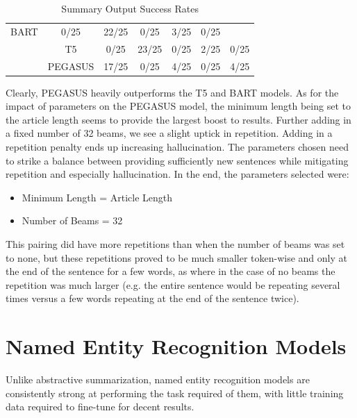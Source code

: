 \documentclass[12pt]{report}
\begin{document}
\begin{table}[H]
\begin{center}
{\begin{tabular}{|c|c|c|c|c|c|c|}
                 BART & 0/25 & 22/25 & 0/25 & 3/25 & 0/25\\&
                 T5 & 0/25 & 23/25 & 0/25 & 2/25 & 0/25\\&
                 PEGASUS & 17/25 & 0/25 & 4/25 & 0/25 & 4/25\\\cline{2-6}
                \hline
            \end{tabular}}
            \end{center}
            \caption{Summary Output Success Rates}
            \label{tab:verify_sum}
            \end{table}
        
        Clearly, PEGASUS heavily outperforms the T5 and BART models. As for the impact of parameters on the PEGASUS model, the minimum length being set to the article length seems to provide the largest boost to results. Further adding in a fixed number of 32 beams, we see a slight uptick in repetition. Adding in a repetition penalty ends up increasing hallucination. The parameters chosen need to strike a balance between providing sufficiently new sentences while mitigating repetition and especially hallucination. In the end, the parameters selected were:
        
        \begin{itemize}
            \item Minimum Length = Article Length
            \item Number of Beams = 32
        \end{itemize}
        
        This pairing did have more repetitions than when the number of beams was set to none, but these repetitions proved to be much smaller token-wise and only at the end of the sentence for a few words, as where in the case of no beams the repetition was much larger (e.g. the entire sentence would be repeating several times versus a few words repeating at the end of the sentence twice).

    \section{Named Entity Recognition Models}
        Unlike abstractive summarization, named entity recognition models are consistently strong at performing the task required of them, with little training data required to fine-tune for decent results.
        
\end{document}
